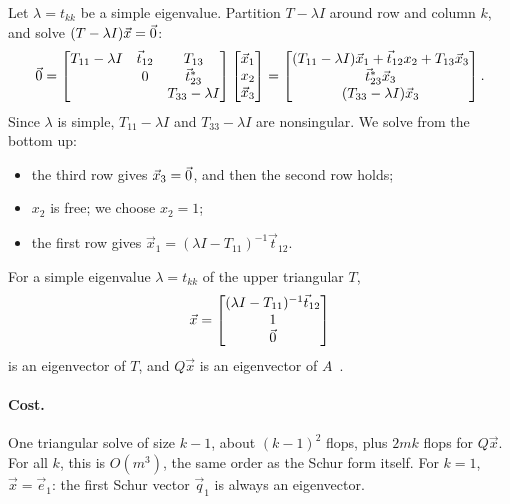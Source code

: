 Let $\lambda = t_{kk}$ be a simple eigenvalue. Partition $T - \lambda I$ around row and column $k$, and solve $(T - \lambda I)\vec{x} = \vec{0}$:
\begin{equation}
  \vec{0} = \begin{bmatrix} T_{11} - \lambda I & \vec{t}_{12} & T_{13} \\ & 0 & \vec{t}_{23}^\ast \\ & & T_{33} - \lambda I \end{bmatrix}\begin{bmatrix} \vec{x}_1 \\ x_2 \\ \vec{x}_3 \end{bmatrix} = \begin{bmatrix} (T_{11} - \lambda I)\vec{x}_1 + \vec{t}_{12}x_2 + T_{13}\vec{x}_3 \\ \vec{t}_{23}^\ast\vec{x}_3 \\ (T_{33} - \lambda I)\vec{x}_3 \end{bmatrix}.
\end{equation}
Since $\lambda$ is simple, $T_{11} - \lambda I$ and $T_{33} - \lambda I$ are nonsingular. We solve from the bottom up:
\begin{itemize}
  \item the third row gives $\vec{x}_3 = \vec{0}$, and then the second row holds;
  \item $x_2$ is free; we choose $x_2 = 1$;
  \item the first row gives $\vec{x}_1 = (\lambda I - T_{11})^{-1}\vec{t}_{12}$.
\end{itemize}

\begin{proposition}
  \label{prop:triangular-eigvec}
  For a simple eigenvalue $\lambda = t_{kk}$ of the upper triangular $T$,
  \begin{equation}
    \vec{x} = \begin{bmatrix} (\lambda I - T_{11})^{-1}\vec{t}_{12} \\ 1 \\ \vec{0} \end{bmatrix}
  \end{equation}
  is an eigenvector of $T$, and $Q\vec{x}$ is an eigenvector of $A$~\cite[\S4.2.1]{Demmel}.
\end{proposition}

\paragraph{Cost.} One triangular solve of size $k - 1$, about $(k-1)^2$ flops, plus $2mk$ flops for $Q\vec{x}$. For all $k$, this is $O(m^3)$, the same order as the Schur form itself. For $k = 1$, $\vec{x} = \vec{e}_1$: the first Schur vector $\vec{q}_1$ is always an eigenvector.

